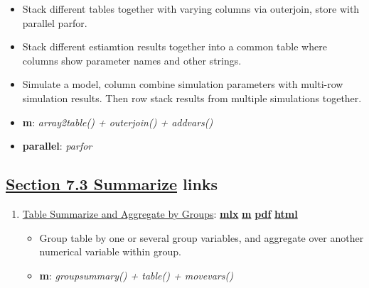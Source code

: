\documentclass[
]{book}
\providecommand{\tightlist}{%
  \setlength{\itemsep}{0pt}\setlength{\parskip}{0pt}}
\begin{document}
\begin{enumerate}
  \begin{itemize}
  \tightlist
  \item
    Stack different tables together with varying columns via outerjoin, store with parallel parfor.
  \item
    Stack different estiamtion results together into a common table where columns show parameter names and other strings.
  \item
    Simulate a model, column combine simulation parameters with multi-row simulation results. Then row stack results from multiple simulations together.
  \item
    \textbf{m}: \emph{array2table() + outerjoin() + addvars()}
  \item
    \textbf{parallel}: \emph{parfor}
  \end{itemize}
\end{enumerate}

\hypertarget{section-7.3-summarizesummarize-links}{%
\subsection{\texorpdfstring{\protect\hyperlink{summarize}{Section 7.3 Summarize} links}{Section 7.3 Summarize links}}\label{section-7.3-summarizesummarize-links}}

\begin{enumerate}
\def\labelenumi{\arabic{enumi}.}
\tightlist
\item
  \href{https://fanwangecon.github.io/M4Econ/table/summarize/htmlpdfm/fs_tab_group_summ.html}{Table Summarize and Aggregate by Groups}: \href{https://github.com/FanWangEcon/M4Econ/blob/master/table/summarize/fs_tab_group_summ.mlx}{\textbf{mlx}} \textbar{} \href{https://github.com/FanWangEcon/M4Econ/blob/master/table/summarize/htmlpdfm/fs_tab_group_summ.m}{\textbf{m}} \textbar{} \href{https://github.com/FanWangEcon/M4Econ/blob/master/table/summarize/htmlpdfm/fs_tab_group_summ.pdf}{\textbf{pdf}} \textbar{} \href{https://fanwangecon.github.io/M4Econ/table/summarize/htmlpdfm/fs_tab_group_summ.html}{\textbf{html}}

  \begin{itemize}
  \tightlist
  \item
    Group table by one or several group variables, and aggregate over another numerical variable within group.
  \item
    \textbf{m}: \emph{groupsummary() + table() + movevars()}
  \end{itemize}
\end{enumerate}

  
\end{document}
